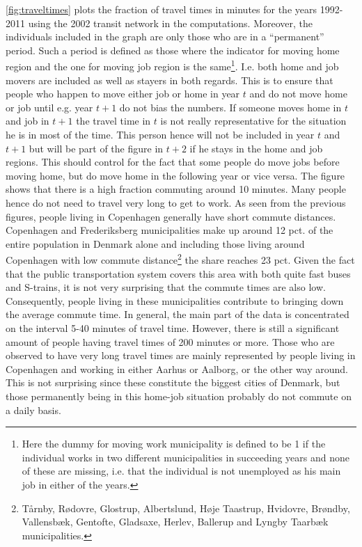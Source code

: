 \autoref{fig:traveltimes} plots the fraction of travel times in minutes for the years 1992-2011 using the 2002 transit network in the computations. Moreover, the individuals included in the graph are only those who are in a ``permanent'' period. Such a period is defined as those where the indicator for moving home region and the one for moving job region is the same\footnote{Here the dummy for moving work municipality is defined to be 1 if the individual works in two different municipalities in succeeding years and none of these are missing, i.e. that the individual is not unemployed as his main job in either of the years.}. I.e. both home and job movers are included as well as stayers in both regards. This is to ensure that people who happen to move either job or home in year $t$ and do not move home or job until e.g. year $t+1$ do not bias the numbers. If someone moves home in $t$ and job in $t+1$ the travel time in $t$ is not really representative for the situation he is in most of the time. This person hence will not be included in year $t$ and $t+1$ but will be part of the figure in $t+2$ if he stays in the home and job regions. This should control for the fact that some people do move jobs before moving home, but do move home in the following year or vice versa. The figure shows that there is a high fraction commuting around 10 minutes. Many people hence do not need to travel very long to get to work. As seen from the previous figures, people living in Copenhagen generally have short commute distances. Copenhagen and Frederiksberg municipalities make up around 12 pct. of the entire population in Denmark alone and including those living around Copenhagen with low commute distance\footnote{Tårnby, Rødovre, Glostrup, Albertslund, Høje Taastrup, Hvidovre, Brøndby, Vallensbæk, Gentofte, Gladsaxe, Herlev, Ballerup and Lyngby Taarbæk municipalities.} the share reaches 23 pct. Given the fact that the public transportation system covers this area with both quite fast buses and S-trains, it is not very surprising that the commute times are also low. Consequently, people living in these municipalities contribute to bringing down the average commute time. In general, the main part of the data is concentrated on the interval 5-40 minutes of travel time. However, there is still a significant amount of people having travel times of 200 minutes or more. Those who are observed to have very long travel times are mainly represented by people living in Copenhagen and working in either Aarhus or Aalborg, or the other way around. This is not surprising since these constitute the biggest cities of Denmark, but those permanently being in this home-job situation probably do not commute on a daily basis. 

